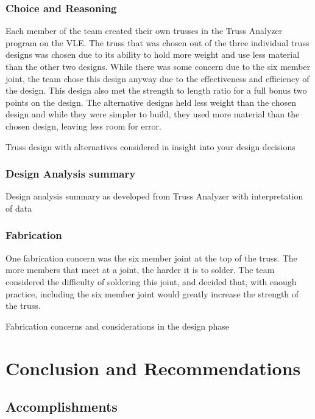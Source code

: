 \documentclass{article}
\let\Oldsection\section
\renewcommand{\section}{\FloatBarrier\Oldsection}
\let\Oldsubsection\subsection
\renewcommand{\subsection}{\FloatBarrier\Oldsubsection}
\let\Oldsubsubsection\subsubsection
\renewcommand{\subsubsection}{\FloatBarrier\Oldsubsubsection}
\begin{document}
\subsubsection{Choice and Reasoning}

Each member of the team created their own trusses in the Truss Analyzer program on the VLE. The truss that was chosen out of the three individual truss designs was chosen due to its ability to hold more weight and use less material than the other two designs. While there was some concern due to the six member joint, the team chose this design anyway due to the effectiveness and efficiency of the design. This design also met the strength to length ratio for a full bonus two points on the design. The alternative designs held less weight than the chosen design and while they were simpler to build, they used more material than the chosen design, leaving less room for error. 

Truss design with alternatives considered in insight into your design decisions

\subsubsection{Design Analysis summary}



Design analysis summary as developed from Truss Analyzer with interpretation of data

\subsubsection{Fabrication}

One fabrication concern was the six member joint at the top of the truss. The more members that meet at a joint, the harder it is to solder. The team considered the difficulty of soldering this joint, and decided that, with enough practice, including the six member joint would greatly increase the strength of the truss.

Fabrication concerns and considerations in the design phase

\newpage

\section{Conclusion and Recommendations}

\subsection{Accomplishments}
\end{document}

